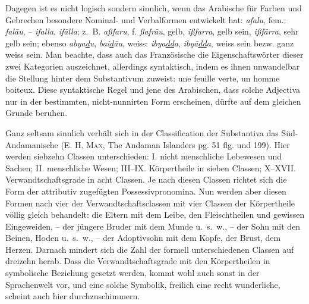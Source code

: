 Dagegen ist es nicht logisch sondern sinnlich, wenn das Arabische für Farben und Gebrechen besondere Nominal- und Verbalformen entwickelt hat: \textit{af}{\AIN}\textit{alu}, fem.: \textit{fa}{\ain}\textit{lāu}, – \textit{if}{\AIN}\textit{alla}, \textit{if}{\AIN}\textit{ālla}; z.~B. \textit{aßfaru}, f. \textit{ßafrāu}, gelb, \textit{ißfarra}, gelb sein, \textit{ißfārra}, sehr gelb sein; ebenso \textit{abya\uline{d}u}, \textit{bai\uline{d}āu}, weiss: \textit{ibya\uline{dd}a}, \textit{ibyā\uline{dd}a}, \label{sp.442} weiss sein bezw. ganz weiss sein. Man beachte, dass auch das Französische die Eigenschaftswörter dieser zwei Kategorien auszeichnet, allerdings syntaktisch, indem es ihnen unwandelbar die Stellung hinter dem Substantivum zuweist: une feuille verte, un homme boiteux. Diese syntaktische Regel und jene des Arabischen, dass solche Adjectiva nur in der bestimmten, nicht-nunnirten Form erscheinen, dürfte auf dem gleichen Grunde beruhen.


Ganz seltsam sinnlich verhält sich in der Classification der Substantiva das Süd-Andamanische (E. H. \textsc{Man}, The Andaman Islanders pg. 51 flg. und 199). Hier werden siebzehn Classen unterschieden: I. nicht menschliche Lebewesen und Sachen; II. menschliche Wesen; III–IX. Körpertheile in sieben Classen; X–XVII. Verwandtschaftsgrade in acht Classen. Je nach diesen Classen richtet sich die Form der attributiv zugefügten Possessivpronomina. Nun werden aber diesen Formen nach vier der Verwandtschaftsclassen mit vier Classen der Körpertheile völlig gleich behandelt: die Eltern mit dem Leibe, den Fleischtheilen und gewissen Eingeweiden, – der jüngere Bruder mit dem Munde u.~s.~w., – der Sohn mit den Beinen, Hoden u.~s.~w., – der Adoptivsohn mit dem Kopfe, der Brust, dem Herzen. Darnach mindert sich die Zahl der \label{fp.422} formell unterschiedenen Classen auf dreizehn herab. Dass die Verwandtschaftsgrade mit den Körpertheilen in symbolische Beziehung gesetzt werden, kommt wohl auch sonst in der Sprachenwelt vor, und eine solche Symbolik, freilich eine recht wunderliche, scheint auch hier durchzuschimmern.


